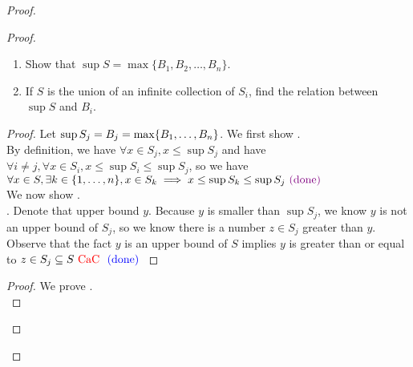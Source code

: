 \documentclass{report}
\begin{document}
\begin{proof}
\begin{proof}
\begin{question}{}{}
\begin{enumerate}
    \item Show that \(\sup S = \max\{B_1, B_2, \ldots, B_n\} \).
    \item If \(S\) is the union of an infinite collection of \(S_i\), find the relation between \(\sup S\) and \(B_i\).
\end{enumerate}
\end{question}
\begin{proof}
Let $\sup S_j=B_j=\max \{ B_1,\dots, B_n \}$. We first show .\\

By definition, we have $\forall x\in S_j,x\leq \sup S_j$ and have $\forall i \neq j, \forall x \in S_i, x\leq \sup S_i\leq \sup S_j $, so we have $\forall x\in S, \exists k \in \{ 1,\dots, n \}, x \in S_k \implies x\leq \sup S_k\leq \sup S_j\textcolor{violet}{\text{ (done) }}$\\

We now show  .\\

. Denote that upper bound $y$. Because $y$ is smaller than $\sup S_j$, we know $y$ is not an upper bound of $S_j$, so we know there is a number  $z \in S_j$ greater than $y$. Observe that the fact $y$ is an upper bound of $S$ implies  $y$ is greater than or equal to $z \in S_j\subseteq S\text{ \textcolor{red}{CaC} }\textcolor{blue}{\text{ (done) }}$
\end{proof}
\begin{proof}
  We prove .\\


\end{proof}
\end{proof}
\end{proof}
\end{document}
